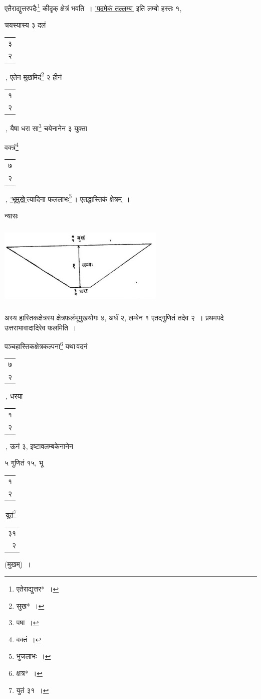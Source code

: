 \documentclass[10pt, openany]{book}
\begin{document}
{{एतैराद्युत्तरपदैः\renewcommand{\thefootnote}{\s ९}\footnote{\s एतेराद्युत्तर*~।} कीदृक् क्षेत्रं भवति~। \hyperref[81]{'पदमेकं तल्लम्ब'} इति
लम्बो हस्तः १,}
{चयस्यास्य ३ दलं \begin{tabular}{|c|}३ \\ २\\ \hline\end{tabular}\,, एतेन मुखमिदं\renewcommand{\thefootnote}{\s १०}\footnote{\s सुख*~।} २ हीनं \begin{tabular}{|c|}१ \\ २\\ \hline\end{tabular}\,, यैषा धरा
सा\renewcommand{\thefootnote}{\s ११}\footnote{\s पषा~।} चयेनानेन ३ युक्ता}
{वक्त्रं\renewcommand{\thefootnote}{\s १२}\footnote{\s वक्तं~।} \begin{tabular}{|c|}७ \\ २\\ \hline\end{tabular}\,, \hyperref[82]{'भूमुखे'}त्यादिना फललाभः\renewcommand{\thefootnote}{\s १३}\footnote{\s भुजलाभः~।}\,। एतद्धास्तिकं
क्षेत्रम्~।}
\vspace{3mm}

न्यासः\textendash 

\hspace{25mm} \includegraphics[width=8cm, height=4cm]{img1.JPG}

{अस्य हास्तिकक्षेत्रस्य क्षेत्रफलं\textendash \;भूमुखयोगः ४, अर्धं २, लम्बेन १
एतद्गुणितं तदेव २~।}
{प्रथमपदे उत्तराभावादादिरेव फलमिति~।}

\newpage

{पञ्चहास्तिकक्षेत्रकल्पना\renewcommand{\thefootnote}{\s १}\footnote{\s *क्षत्र*~।} यथा\textendash \,वदनं \begin{tabular}{|c|}७ \\ २\\ \hline\end{tabular}\,, धरया \begin{tabular}{|c|}१ \\ २\\ \hline\end{tabular}\,, ऊनं
३, इष्टावलम्बकेनानेन}
{५ गुणितं १५, भू\textendash \hspace{-3mm} \begin{tabular}{r}१\\
२ \end{tabular} \hspace{-5mm} \textendash \,युतं\renewcommand{\thefootnote}{\s २}\footnote{\s युतं ३१~।}\begin{tabular}{r}३१\\
२ \end{tabular}(मुखम्)~।}
\vspace{3mm}

}
\end{document}
